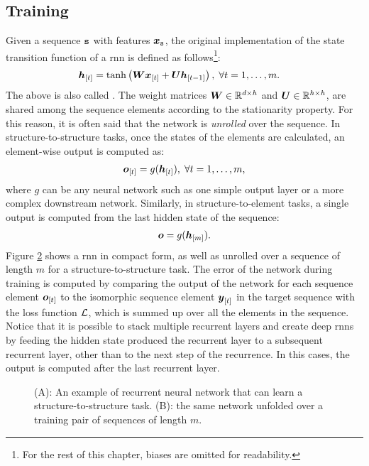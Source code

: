\subsection{Training}
Given a sequence $\mathtt{s}$ with features $\Vector{x}_{\Seq{s}}$, the original implementation of the state transition function of a \gls{rnn} is defined as follows\footnote{For the rest of this chapter, biases are omitted for readability.}:
\begin{align*}
    \Elem{h}{t} &= \tanh\Par{\Matrix{W}\Elem{x}{t} + \Matrix{U}\Elem{h}{t-1}},\; \forall t=1, \ldots, m.
\end{align*}
The above is also called . The weight matrices $\Matrix{W} \in \Real^{d \times h}$ and $\Matrix{U} \in \Real^{h \times h}$, are shared among the sequence elements according to the stationarity property. For this reason, it is often said that the network is \emph{unrolled} over the sequence. In structure-to-structure tasks, once the states of the elements are calculated, an element-wise output is computed as:
\begin{align*}
    \Elem{o}{t} = g(\Elem{h}{t}),\; \forall t=1, \ldots, m,
\end{align*}
where $g$ can be any neural network such as one simple output layer or a more complex downstream network. Similarly, in structure-to-element tasks, a single output is computed from the last hidden state of the sequence:
\begin{align*}
    \Vector{o} = g(\Elem{h}{m}).
\end{align*}
Figure \ref{fig:rnn-unfold} shows a \gls{rnn} in compact form, as well as unrolled over a sequence of length $m$ for a structure-to-structure task. The error of the network during training is computed by comparing the output of the network for each sequence element $\Elem{o}{t}$ to the isomorphic sequence element $\Elem{y}{t}$ in the target sequence with the loss function $\mathcal{L}$, which is summed up over all the elements in the sequence. Notice that it is possible to stack multiple recurrent layers and create deep \glspl{rnn} by feeding the hidden state produced the recurrent layer to a subsequent recurrent layer, other than to the next step of the recurrence. In this cases, the output is computed after the last recurrent layer.
\begin{figure*}[h!]
    \begin{subfigure}[b]{0.5\linewidth}
        \centering
        \resizebox{.6\textwidth}{!}{}
        \caption{}
        \label{fig:rnn}
    \end{subfigure}
    \begin{subfigure}[b]{0.59\linewidth}
        \centering
        \resizebox{.8\textwidth}{!}{}
        \caption{}
        \label{fig:rnn-unfold}
    \end{subfigure}
    \caption{(A): An example of recurrent neural network that can learn a structure-to-structure task. (B): the same network unfolded over a training pair of sequences of length $m$.}
    \label{fig:rnn-example}
\end{figure*}
